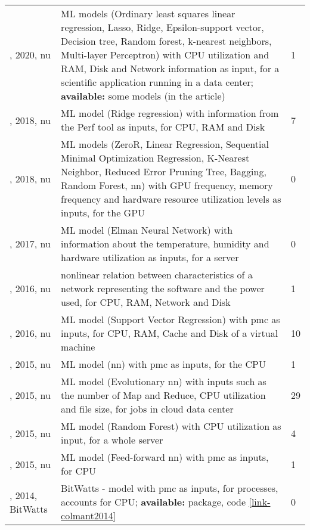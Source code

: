 \begin{longtable}{|>{\raggedright\arraybackslash}p{2.75cm}|p{11.75cm}|p{0.7cm}|}
\cite{karantoumanis2020}, 2020, \acrshort{nu} & ML models (Ordinary least squares linear regression, Lasso, Ridge, Epsilon-support vector, Decision tree, Random forest, k-nearest neighbors, Multi-layer Perceptron) with CPU utilization and RAM, Disk and Network information as input, for a scientific application running in a data center; \textbf{available:} some models (in the article) & 1 \\
\cite{fu2018}, 2018, \acrshort{nu} & ML model (Ridge regression) with information from the Perf tool as inputs, for CPU, RAM and Disk & 7 \\
\cite{dutta2018}, 2018, \acrshort{nu} & ML models (ZeroR, Linear Regression, Sequential Minimal Optimization Regression, K-Nearest Neighbor, Reduced Error Pruning Tree, Bagging, Random Forest, \acrshort{nn}) with GPU frequency, memory frequency and hardware resource utilization levels as inputs, for the GPU & 0 \\
\cite{jiang2017}, 2017, \acrshort{nu} & ML model (Elman Neural Network) with information about the temperature, humidity and hardware utilization as inputs, for a server & 0 \\
\cite{li2016b}, 2016, \acrshort{nu} & nonlinear relation between characteristics of a network representing the software and the power used, for CPU, RAM, Network and Disk & 1 \\
\cite{veni2016}, 2016, \acrshort{nu} & ML model (Support Vector Regression) with \acrshort{pmc} as inputs, for CPU, RAM, Cache and Disk of a virtual machine & 10 \\
\cite{gutierrez2015a}, 2015, \acrshort{nu} & ML model (\acrshort{nn}) with \acrshort{pmc} as inputs, for the CPU & 1 \\
\cite{foo2015}, 2015, \acrshort{nu} & ML model (Evolutionary \acrshort{nn}) with inputs such as the number of Map and Reduce, CPU utilization and file size, for jobs in cloud data center & 29 \\
\cite{harton2015}, 2015, \acrshort{nu} & ML model (Random Forest) with CPU utilization as input, for a whole server & 4 \\
\cite{gutierrez2015b}, 2015, \acrshort{nu} & ML model (Feed-forward \acrshort{nn}) with \acrshort{pmc} as inputs, for CPU & 1 \\
\cite{colmant2014}, 2014, BitWatts & BitWatts - model with \acrshort{pmc} as inputs, for processes, accounts for CPU; \textbf{available:} package, code \href{https://github.com/Spirals-Team/bitwatts}{\ref*{link-colmant2014}} & 0 \\

\end{longtable}
